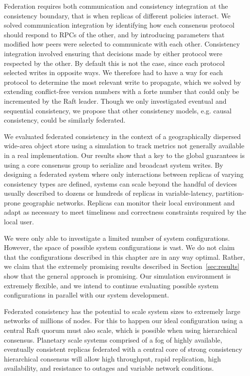 Federation requires both communication and consistency integration at the consistency boundary, that is when replicas of different policies interact.
We solved communication integration by identifying how each consensus protocol should respond to RPCs of the other, and by introducing parameters that modified how peers were selected to communicate with each other.
Consistency integration involved ensuring that decisions made by either protocol were respected by the other.
By default this is not the case, since each protocol selected writes in opposite ways.
We therefore had to have a way for each protocol to determine the most relevant write to propagate, which we solved by extending conflict-free version numbers with a forte number that could only be incremented by the Raft leader.
Though we only investigated eventual and sequential consistency, we propose that other consistency models, e.g. causal consistency, could be similarly federated.

We evaluated federated consistency in the context of a geographically dispersed wide-area object store using a simulation to track metrics not generally available in a real implementation.
Our results show that a key to the global guarantees is using a core consensus group to serialize and broadcast system writes.
By designing a federated system where only interactions between replicas of varying consistency types are defined, systems can scale beyond the handful of devices usually described to dozens or hundreds of replicas in variable-latency, partition-prone geographic networks.
Replicas can monitor their local environment and adapt as necessary to meet timeliness and correctness constraints required by the local user.

We were only able to investigate a limited number of system configurations.
However, the space of possible system configurations is vast.
We do not claim that the configurations described in this chapter are in any way optimal.
Rather, we claim that the extremely promising results described in
Section~\ref{sec:results} show that the general approach is promising.
Our simulation environment is extremely flexible, and we intend to continue
evaluating possible system configurations in parallel with our system development.

Federated consistency has the potential to scale system sizes to extremely large networks of millions of nodes.
For this to happen our ideal configuration using a central Raft quorum must also scale, which is possible when using hierarchical consensus.
Planetary scale systems comprised of a fog of highly available, eventually consistent replicas federated with a central core of strong consistency hierarchical consensus will allow high throughput, rapid replication, high availability, and resistance to outages and variable network conditions.
